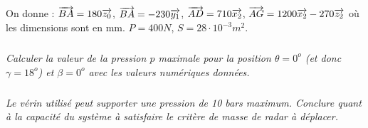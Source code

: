 \documentclass[10pt]{article}
\begin{document}
On donne : $\overrightarrow{BA}=180\overrightarrow{z_0}$, $\overrightarrow{BA}=-230\overrightarrow{y_1}$, $\overrightarrow{AD}=710\overrightarrow{x_2}$, $\overrightarrow{AG}=1200\overrightarrow{x_2}-270\overrightarrow{z_2}$ où les dimensions sont en mm. $P=400N$, $S=28\cdot 10^{-3}m^2$.

\subparagraph{}
\textit{Calculer la valeur de la pression $p$ maximale pour la position $\theta=0^o$ (et donc $\gamma = 18^o$) et $\beta = 0^o$ avec les valeurs numériques données.}


\subparagraph{}
\textit{Le vérin utilisé peut supporter une pression de 10 bars maximum. Conclure quant à la capacité du système à satisfaire le critère de masse de radar à déplacer.}
\end{document}
